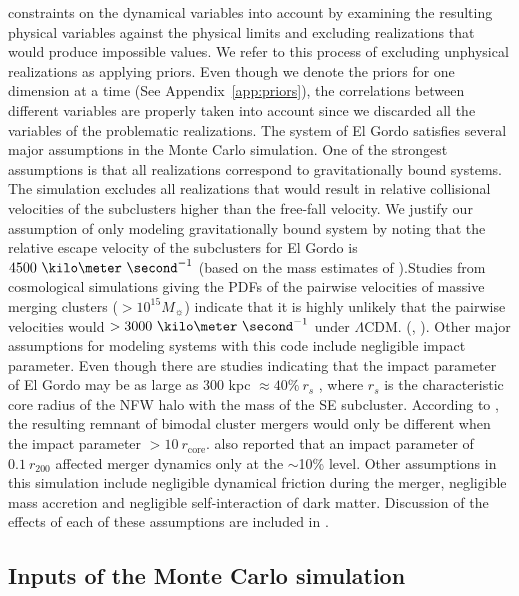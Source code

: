 constraints on the dynamical variables into account by
examining the resulting physical variables against the physical limits and
excluding realizations that would produce impossible values. We refer to this
process of excluding unphysical realizations as applying priors. 
Even though we denote the priors for one dimension at a time (See Appendix~\ref{app:priors}), 
the correlations between different variables are properly taken into account
since we discarded all the variables of the problematic
realizations. 
The system of El Gordo satisfies several major assumptions in the Monte Carlo
simulation.
One of the strongest assumptions is that all realizations correspond to
gravitationally bound systems. The simulation excludes all realizations
that would result in relative collisional velocities of the subclusters
higher than the free-fall velocity. We justify our assumption of only
modeling gravitationally bound system by noting that the relative escape
velocity of the subclusters for El Gordo is
$4500~\kilo\meter~\second^{-1}$ (based on the mass estimates of
\cite{Jee13}).Studies from cosmological simulations giving the PDFs of the pairwise velocities of massive merging clusters ($>
10^{15} M_{\sun}$) indicate that it is highly unlikely that the pairwise
velocities would $> 3000~\kilo \meter~\second^{-1}$ under $\Lambda$CDM.
(\citealt{Thompson12}, \citealt{Lee2010}).  Other major assumptions for
modeling systems with this code include negligible impact parameter. Even
though there are studies indicating that the impact parameter of El Gordo
may be as large as $300$ kpc $ \approx 40\%~r_s$ \citep{Molnar14},
where $r_s$ is the characteristic core
radius of the NFW halo with the mass of the SE subcluster. According to
\cite{Ricker98}, the resulting remnant of bimodal cluster mergers would only be
different when the impact parameter $> 10~ r_{\text{core}}$.
\cite{Mastropietro2008a} also reported that an impact parameter of $0.1~
r_{200}$ affected merger dynamics only at the $\sim$10\% level.   
Other assumptions in this simulation include negligible dynamical friction
during the merger, negligible mass accretion and negligible self-interaction
of dark matter. Discussion of the effects of each of these assumptions are
included in .  
\par
\subsection{Inputs of the Monte Carlo simulation} \label{sec: inputs}
\setcounter{table}{0} 

